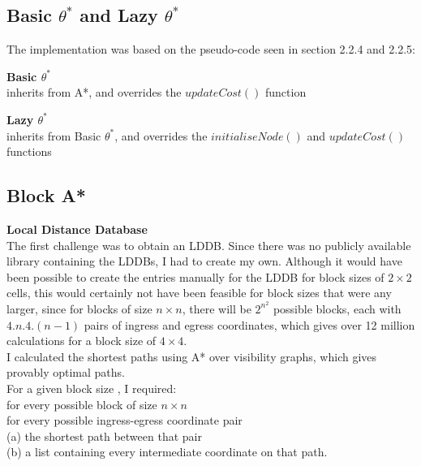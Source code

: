 \documentclass[12pt,notitlepage]{report}
\begin{document}
\subsection {Basic $\theta ^{*}$ and Lazy $\theta ^{*}$}

The implementation was based on the pseudo-code seen in section 2.2.4 and 2.2.5: 
\begin{description}
\item{\bf Basic $\theta ^{*}$}\\ \hfill inherits from A*, and overrides the $updateCost()$ function
\item {\bf Lazy $\theta ^{*}$ }\\ \hfill inherits from Basic $\theta ^{*}$, and overrides the $initialiseNode()$ and $updateCost()$ functions
\end{description}

\subsection {Block A*}

{\bf Local Distance Database}\\

\noindent
The first challenge was to obtain an LDDB. Since there was no publicly available library containing the LDDBs, I had to create my own. Although it would have been possible to create the entries manually for the LDDB for block sizes of $2 \times 2$ cells, this would certainly not have been feasible for block sizes that were any larger, since for blocks of size {$n \times n$}, there will be $2^{n^{2}}$ possible blocks, each with $4.n.4.(n-1)$ pairs of ingress and egress coordinates, which gives over 12 million calculations for a block size of $4 \times 4$.\\

\noindent
I calculated the shortest paths using A* over visibility graphs, which gives provably optimal paths.\\

\noindent
For a given block size , I required:\\
\indent for every possible block of size {$n \times n$}\\
\indent \indent for every possible ingress-egress coordinate pair\\
\indent \indent \indent (a) the shortest path between that pair\\
\indent \indent \indent (b) a list containing every intermediate coordinate on that path.\\
\end{document}
